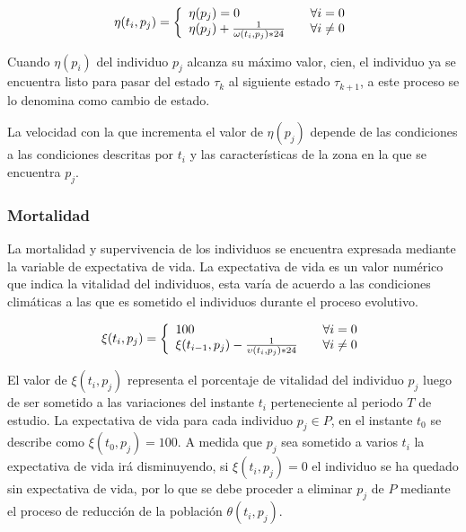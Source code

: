 \begin{equation}
\eta (t_{i}, p_{j}) = \left\{
  \begin{array}{l l}
    \eta (p_{j}) = 0 & \quad \forall i = 0 \\
    \eta (p_{j}) + \frac{1}{\omega(t_{i}, p_{j}) * 24} & \quad \forall i \neq 0
  \end{array} \right.
\end{equation}

Cuando $\eta(p_{i})$ del individuo $p_{j}$ alcanza su máximo valor, cien, el individuo ya se encuentra listo para
pasar del estado $\tau_{k}$ al siguiente estado $\tau_{k+1}$, a este proceso se lo denomina como cambio de estado.

La velocidad con la que incrementa el valor de $\eta(p_{j})$ depende de las condiciones a las condiciones
descritas  por $t_{i}$ y las características de la zona en la que se encuentra $p_{j}$.

\subsubsection{Mortalidad}
La mortalidad y supervivencia de los individuos se encuentra expresada mediante la variable de expectativa de
vida. La expectativa de vida es un valor numérico que indica la vitalidad del individuos, esta varía de acuerdo
a las condiciones climáticas a las que es sometido el individuos durante el proceso evolutivo.

\begin{equation}
\xi (t_{i}, p_{j}) = \left\{
  \begin{array}{l l}
    100 & \quad \forall i = 0 \\
    \xi (t_{i-1}, p_{j}) - \frac{1}{\upsilon(t_{i}, p_{j}) * 24} & \quad \forall i \neq 0
  \end{array} \right.
\end{equation}

El valor de $\xi (t_{i}, p_{j})$ representa el porcentaje de vitalidad del
individuo $p_{j}$ luego de ser sometido a las variaciones del instante
$t_{i}$ perteneciente al periodo $T$ de estudio. La expectativa de vida
para cada individuo $p_{j} \in P$, en el instante $t_{0}$ se describe como
$\xi (t_{0}, p_{j})= 100$. A medida que $p_{j}$ sea sometido a varios
$t_{i}$ la expectativa de vida irá disminuyendo, si $\xi (t_{i}, p_{j})= 0$ el
individuo se ha quedado sin expectativa de vida, por lo que se debe proceder
a eliminar $p_{j}$ de $P$ mediante el proceso de reducción de la población
$\theta (t_{i}, p_{j})$.

